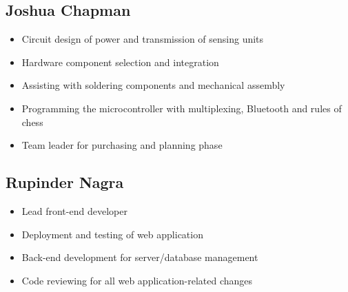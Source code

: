\documentclass{article}
\begin{document}
\subsection{Joshua Chapman}
\begin{itemize}
    \item Circuit design of power and transmission of sensing units
    \item Hardware component selection and integration
    \item Assisting with soldering components and mechanical assembly
    \item Programming the microcontroller with multiplexing, Bluetooth and rules of chess
    \item Team leader for purchasing and planning phase
\end{itemize}

\subsection{Rupinder Nagra}
\begin{itemize}
    \item Lead front-end developer
    \item Deployment and testing of web application
    \item Back-end development for server/database management
    \item Code reviewing for all web application-related changes
\end{itemize}
\end{document}

